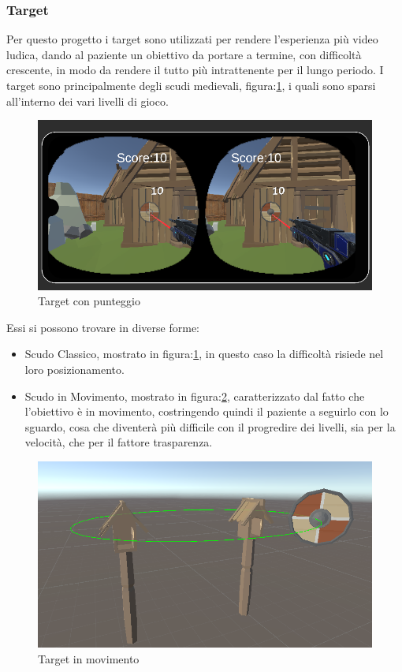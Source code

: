 \documentclass[
a4paper,
cleardoublepage=empty,
headings=twolinechapter,
numbers=autoenddot,
]{scrbook}
\begin{document}
    \subsubsection{Target}
    Per questo progetto i target sono utilizzati per rendere l'esperienza più video ludica, dando al paziente un obiettivo da portare a termine, con difficoltà crescente, in modo da rendere il tutto più intrattenente per il lungo periodo.
    I target sono principalmente degli scudi medievali, figura:\ref{fig:target_score}, i quali sono sparsi all'interno dei vari livelli di gioco.
    \begin{figure}[H]
	  	\centering
	  	\includegraphics[width=0.7\linewidth]{image/target_score}
	  	\caption{Target con punteggio}
	  	\label{fig:target_score}
    \end{figure}
    Essi si possono trovare in diverse forme:
    \begin{itemize}
       \item Scudo Classico, mostrato in figura:\ref{fig:target_score}, in questo caso la difficoltà risiede nel loro posizionamento.
       \item Scudo in Movimento, mostrato in figura:\ref{fig:target_movimento}, caratterizzato dal fatto che l'obiettivo è in movimento, costringendo quindi il paziente a seguirlo con  lo sguardo, cosa che diventerà più difficile con il progredire dei livelli, sia per la velocità, che per il fattore trasparenza.
      \end{itemize}
  \begin{figure}[H]
  	\centering
  	\includegraphics[width=0.7\linewidth]{image/target_movimento}
  	\caption{Target in movimento}
  	\label{fig:target_movimento}
  \end{figure}
\end{document}
